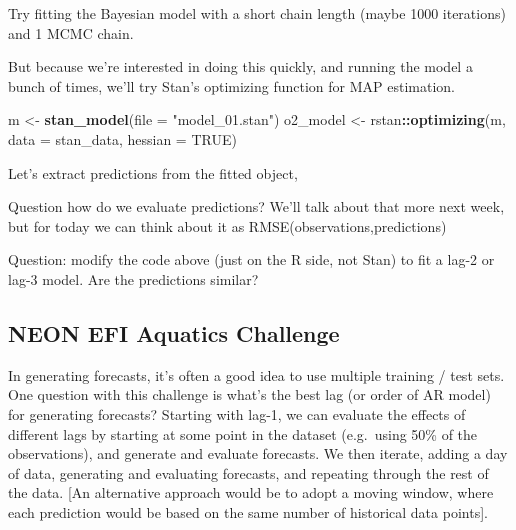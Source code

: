 \documentclass[
]{article}
\newenvironment{Shaded}{\begin{snugshade}}{\end{snugshade}}
\newcommand{\DataTypeTok}[1]{\textcolor[rgb]{0.13,0.29,0.53}{#1}}
\newcommand{\FloatTok}[1]{\textcolor[rgb]{0.00,0.00,0.81}{#1}}
\newcommand{\KeywordTok}[1]{\textcolor[rgb]{0.13,0.29,0.53}{\textbf{#1}}}
\newcommand{\NormalTok}[1]{#1}
\newcommand{\OperatorTok}[1]{\textcolor[rgb]{0.81,0.36,0.00}{\textbf{#1}}}
\newcommand{\OtherTok}[1]{\textcolor[rgb]{0.56,0.35,0.01}{#1}}
\newcommand{\StringTok}[1]{\textcolor[rgb]{0.31,0.60,0.02}{#1}}
\begin{document}
Try fitting the Bayesian model with a short chain length (maybe 1000
iterations) and 1 MCMC chain.

But because we're interested in doing this quickly, and running the
model a bunch of times, we'll try Stan's optimizing function for MAP
estimation.

\begin{Shaded}
\begin{Highlighting}[]
\NormalTok{m <-}\StringTok{ }\KeywordTok{stan_model}\NormalTok{(}\DataTypeTok{file =} \StringTok{"model_01.stan"}\NormalTok{)}
\NormalTok{o2_model <-}\StringTok{ }\NormalTok{rstan}\OperatorTok{::}\KeywordTok{optimizing}\NormalTok{(m, }\DataTypeTok{data =}\NormalTok{ stan_data, }\DataTypeTok{hessian =} \OtherTok{TRUE}\NormalTok{)}
\end{Highlighting}
\end{Shaded}

Let's extract predictions from the fitted object,

\begin{Shaded}
\end{Shaded}

Question how do we evaluate predictions? We'll talk about that more next
week, but for today we can think about it as
RMSE(observations,predictions)

Question: modify the code above (just on the R side, not Stan) to fit a
lag-2 or lag-3 model. Are the predictions similar?

\hypertarget{sec-neon-oxygen-iterate}{%
\subsection{NEON EFI Aquatics Challenge}\label{sec-neon-oxygen-iterate}}

In generating forecasts, it's often a good idea to use multiple training
/ test sets. One question with this challenge is what's the best lag (or
order of AR model) for generating forecasts? Starting with lag-1, we can
evaluate the effects of different lags by starting at some point in the
dataset (e.g.~using 50\% of the observations), and generate and evaluate
forecasts. We then iterate, adding a day of data, generating and
evaluating forecasts, and repeating through the rest of the data. {[}An
alternative approach would be to adopt a moving window, where each
prediction would be based on the same number of historical data
points{]}.
\end{document}
